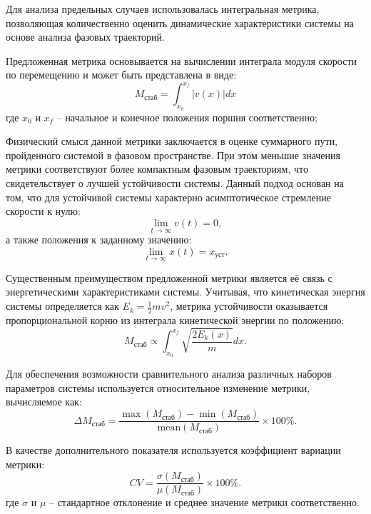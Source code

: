 Для анализа предельных случаев использовалась интегральная метрика,
позволяющая количественно оценить динамические характеристики системы на основе анализа фазовых траекторий.

Предложенная метрика основывается на вычислении интеграла модуля скорости по перемещению и может быть представлена в виде:
\begin{equation*}
M_\text{стаб} = \int_{x_0}^{x_f} |v(x)| dx
\end{equation*}
где $x_0$ и $x_f$ -- начальное и конечное положения поршня соответственно;

Физический смысл данной метрики заключается в оценке суммарного пути, пройденного системой в фазовом пространстве.
При этом меньшие значения метрики соответствуют более компактным фазовым траекториям, что свидетельствует о лучшей устойчивости системы.
Данный подход основан на том, что для устойчивой системы характерно асимптотическое стремление
скорости к нулю:
\begin{equation*}
\lim_{t \to \infty} v(t) = 0,
\end{equation*}
а также положения к заданному значению:
\begin{equation*}
\lim_{t \to \infty} x(t) = x_\text{уст}.
\end{equation*}

Существенным преимуществом предложенной метрики является её связь с энергетическими
характеристиками системы. Учитывая, что кинетическая энергия системы
определяется как $E_k = \frac{1}{2}mv^2$, метрика устойчивости оказывается пропорциональной
корню из интеграла кинетической энергии по положению:
\begin{equation*}
M_\text{стаб} \propto \int_{x_0}^{x_f} \sqrt{\frac{2E_k(x)}{m}} dx.
\end{equation*}

Для обеспечения возможности сравнительного анализа различных наборов параметров системы используется относительное изменение метрики, вычисляемое как:
\begin{equation*}
   \Delta M_\text{стаб} = \frac{\max(M_\text{стаб}) - \min(M_\text{стаб})}{\text{mean}(M_\text{стаб})} \times 100\%.
\end{equation*}

В качестве дополнительного показателя используется коэффициент вариации метрики:
\begin{equation*}
  CV = \frac{\sigma(M_\text{стаб})}{\mu(M_\text{стаб})} \times 100\%.
\end{equation*}
где $\sigma$ и $\mu$ -- стандартное отклонение и среднее значение метрики соответственно.

